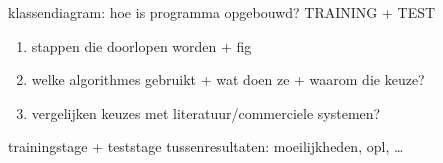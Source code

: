 klassendiagram: hoe is programma opgebouwd?
TRAINING + TEST
\begin{enumerate}
\item stappen die doorlopen worden + fig
\item welke algorithmes gebruikt + wat doen ze + waarom die keuze?
\item vergelijken keuzes met literatuur/commerciele systemen?
\end{enumerate}


trainingstage + teststage
tussenresultaten: moeilijkheden, opl, \ldots


